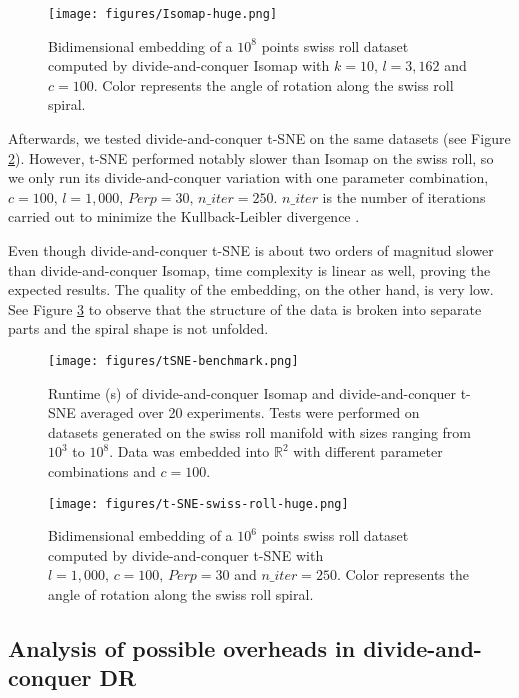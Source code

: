\begin{figure}[ht]
    \centering
    \texttt{[image: figures/Isomap-huge.png]}
    \caption{Bidimensional embedding of a $10^8$ points swiss roll dataset \citep{Spiwokv2007} computed by divide-and-conquer Isomap with $k=10, \, l=3,162$ and $c=100$. Color represents the angle of rotation along the swiss roll spiral.}
    \label{fig:Isomap-huge}
\end{figure}

Afterwards, we tested divide-and-conquer t-SNE on the same datasets (see Figure \ref{fig:t-SNE-benchmark}). However, t-SNE performed notably slower than Isomap on the swiss roll, so we only run its divide-and-conquer variation with one parameter combination, $c = 100, \, l=1,000, \, Perp=30, \, n\_iter=250$. $n\_iter$ is the number of iterations carried out to minimize the Kullback-Leibler divergence \citep{Kullback1951}.

Even though divide-and-conquer t-SNE is about two orders of magnitud slower than divide-and-conquer Isomap, time complexity is linear as well, proving the expected results. The quality of the embedding, on the other hand, is very low. See Figure \ref{fig:t-SNE-huge} to observe that the structure of the data is broken into separate parts and the spiral shape is not unfolded.

\begin{figure}[ht]
    \centering
    \texttt{[image: figures/tSNE-benchmark.png]}
    \caption{Runtime (s) of divide-and-conquer Isomap and divide-and-conquer t-SNE averaged over 20 experiments. Tests were performed on datasets generated on the swiss roll manifold \citep{Spiwokv2007} with sizes ranging from $10^3$ to $10^8$. Data was embedded into $\mathbb{R}^2$ with different parameter combinations and $c=100$.}
    \label{fig:t-SNE-benchmark}
\end{figure}

\begin{figure}[ht]
    \centering
    \texttt{[image: figures/t-SNE-swiss-roll-huge.png]}
    \caption{Bidimensional embedding of a $10^6$ points swiss roll dataset \citep{Spiwokv2007} computed by divide-and-conquer t-SNE with $l=1,000, \, c=100, \, Perp=30$ and $n\_iter=250$. Color represents the angle of rotation along the swiss roll spiral.}
    \label{fig:t-SNE-huge}
\end{figure}

\subsection{Analysis of possible overheads in divide-and-conquer DR}

